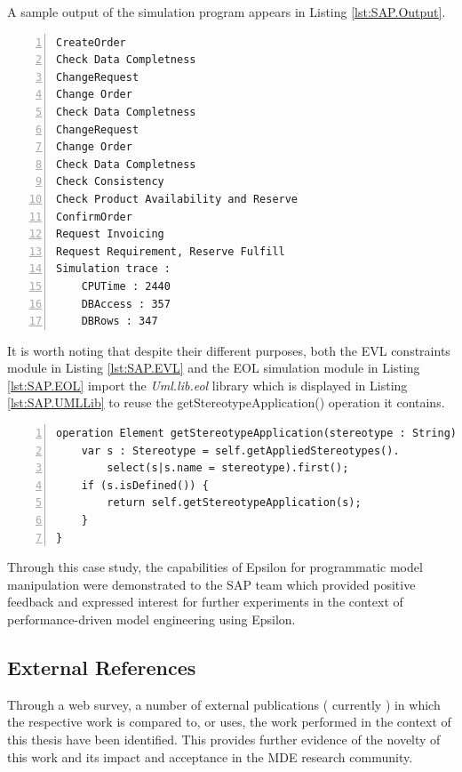 A sample output of the simulation program appears in Listing \ref{lst:SAP.Output}.

\begin{lstlisting}[float=tbp, basicstyle=\ttfamily\footnotesize, flexiblecolumns=true, numbers=left, nolol=true, caption=Sample output of the simulation program of Listing \ref{lst:SAP.EOL}, label=lst:SAP.Output, tabsize=2]
CreateOrder
Check Data Completness
ChangeRequest
Change Order
Check Data Completness
ChangeRequest
Change Order
Check Data Completness
Check Consistency
Check Product Availability and Reserve
ConfirmOrder
Request Invoicing
Request Requirement, Reserve Fulfill
Simulation trace : 
	CPUTime : 2440
	DBAccess : 357
	DBRows : 347
\end{lstlisting}

It is worth noting that despite their different purposes, both the EVL constraints module in Listing \ref{lst:SAP.EVL} and the EOL simulation module in Listing \ref{lst:SAP.EOL} import the \emph{Uml.lib.eol} library which is displayed in Listing \ref{lst:SAP.UMLLib} to reuse the getStereotypeApplication() operation it contains.

\begin{lstlisting}[float=tbp, basicstyle=\ttfamily\footnotesize, flexiblecolumns=true, numbers=left, nolol=true, caption=The shared Uml.lib.eol library, label=lst:SAP.UMLLib, language=EOL, tabsize=2]
operation Element getStereotypeApplication(stereotype : String) {
	var s : Stereotype = self.getAppliedStereotypes().
		select(s|s.name = stereotype).first();
	if (s.isDefined()) {
		return self.getStereotypeApplication(s);
	}
}
\end{lstlisting}

Through this case study, the capabilities of Epsilon for programmatic model manipulation were demonstrated to the SAP team which provided positive feedback and expressed interest for further experiments in the context of performance-driven model engineering using Epsilon.

\subsection{External References}

Through a web survey, a number of external publications ( currently \cite{Zito2006,Langlois2006,Queralt2006,Boronat2006,Conmy2006,Karlsch2006,Eessaar2006,Costa2007,MinimalOCL,AlgebraicView,CrosscuttingMT,FeatureOriented,Weise2007,Pons08,Brauer2007,Rubin2008,VORA,Markovic2008,BrauerThesis,Reiter22007,Pons2007,Lazar2007,ReiterPetri2007,Zamani2007,Jeanneret2008}) in which the respective work is compared to, or uses, the work performed in the context of this thesis have been identified. This provides further evidence of the novelty of this work and its impact and acceptance in the MDE research community.

